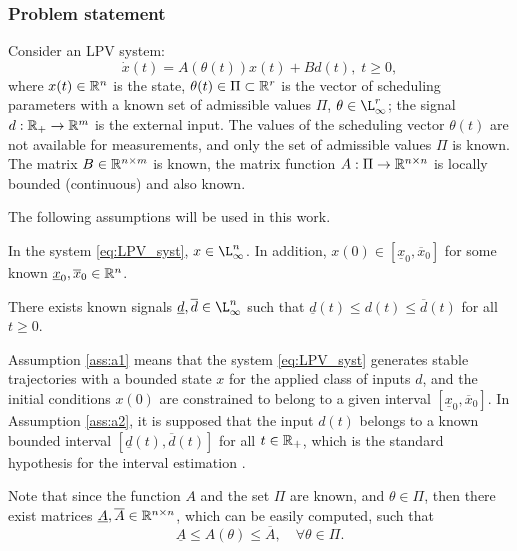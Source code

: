 \subsubsection{\label{sec:Problem-statement} Problem statement}

Consider an LPV system:
\begin{equation}
\dot{x}(t)=A(\theta(t))x(t)+Bd(t),\;t\geq0,\label{eq:LPV_syst}
\end{equation}
where $x(t)\in\mathbb{R}^{n}$ is the state, $\theta(t)\in\Pi\subset\mathbb{R}^{r}$ is the vector of scheduling parameters with a known set of admissible values $\Pi$, $\theta\in\L_{\infty}^{r}$; the signal $d:\mathbb{R}_{+}\to\mathbb{R}^{m}$ is the external input. The values of the scheduling vector $\theta(t)$ are not available for measurements, and only the set of admissible values $\Pi$ is known. The matrix $B\in\mathbb{R}^{n\times m}$ is known, the matrix function $A:\Pi\to\mathbb{R}^{n\times n}$ is locally bounded (continuous) and also known.

The following assumptions will be used in this work.
\begin{assumption}
	\label{ass:a1} In the system \eqref{eq:LPV_syst}, $x\in\L_{\infty}^{n}$. In addition, $x(0)\in[\underline{x}_{0},\overline{x}_{0}]$ for some known $\underline{x}_{0},\overline{x}_{0}\in\mathbb{R}^{n}$.
\end{assumption}

\begin{assumption}
	\label{ass:a2} There exists known signals $\underline{d},\overline{d}\in\L_{\infty}^{n}$ such that $\underline{d}(t)\leq d(t)\leq\overline{d}(t)$ for all $t\geq0$.
\end{assumption}
Assumption \ref{ass:a1} means that the system \eqref{eq:LPV_syst} generates stable trajectories with a bounded state $x$ for the applied class of inputs $d$, and the initial conditions $x(0)$ are constrained to belong to a given interval $[\underline{x}_{0},\overline{x}_{0}]$. In Assumption \ref{ass:a2}, it is supposed that the input $d(t)$ belongs to a known bounded interval $[\underline{d}(t),\overline{d}(t)]$ for all $t\in\mathbb{R}_{+}$, which is the standard hypothesis for the interval estimation \cite{Efimov2016,Raiessi2018}.

Note that since the function $A$ and the set $\Pi$ are known, and $\theta\in\Pi$, then there exist matrices $\underline{A},\overline{A}\in\mathbb{R}^{n\times n}$, which can be easily computed, such that 
\[
\underline{A}\leq A(\theta)\leq\overline{A},\quad\forall\theta\in\Pi.
\]


